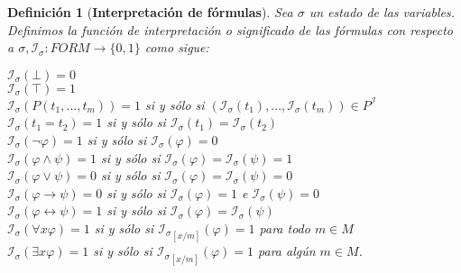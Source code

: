 \documentclass[letterpaper,11pt]{article}
\newtheorem{teo}{Definición}[]
\begin{document}
\begin{enumerate}
\begin{itemize}
            \begin{teo}[\textbf{Interpretación de fórmulas}]
                Sea $\sigma$ un estado de las variables. Definimos la
                función de interpretación o significado de las fórmulas con 
                respecto a $\sigma, \mathcal{I_{\sigma}}: FORM \rightarrow
                \{ 0,1 \}$ como sigue:
                \begin{center}
                    $\mathcal{I_{\sigma}}(\bot) = 0$ \\
                    $\mathcal{I_{\sigma}}(\top) = 1$ \\
                    $\mathcal{I_{\sigma}}(P(t_{1},...,t_{m})) = 1$ si y 
                    sólo si $(\mathcal{I_{\sigma}}(t_{1}), ...,
                    \mathcal{I_{\sigma}}(t_{m})) \in P^{\mathcal{I}}$ \\
                    $\mathcal{I_{\sigma}}(t_{1}=t_{2}) = 1$ si y sólo si 
                    $\mathcal{I_{\sigma}}(t_{1}) = 
                    \mathcal{I_{\sigma}}(t_{2})$ \\
                    $\mathcal{I_{\sigma}}(\neg \varphi) = 1$ si y sólo si 
                    $\mathcal{I_{\sigma}}(\varphi) = 0$ \\
                    $\mathcal{I_{\sigma}}(\varphi \land \psi) = 1$ si y sólo 
                    si $\mathcal{I_{\sigma}}(\varphi) = 
                    \mathcal{I_{\sigma}}(\psi) = 1$ \\
                    $\mathcal{I_{\sigma}}(\varphi \lor \psi) = 0$ si y sólo 
                    si $\mathcal{I_{\sigma}}(\varphi) = 
                    \mathcal{I_{\sigma}}(\psi) = 0$ \\
                    $\mathcal{I_{\sigma}}(\varphi \rightarrow \psi) = 0$ si 
                    y sólo si $\mathcal{I_{\sigma}}(\varphi) = 1$ e 
                    $\mathcal{I_{\sigma}}(\psi) = 0$ \\
                    $\mathcal{I_{\sigma}}(\varphi \leftrightarrow \psi) = 1$
                    si y sólo si $\mathcal{I_{\sigma}}(\varphi) = 
                    \mathcal{I_{\sigma}}(\psi)$ \\
                    $\mathcal{I_{\sigma}}(\forall x \varphi) = 1$ si y sólo si 
                    $\mathcal{I_{\sigma}}_{[x/m]}(\varphi) = 1$ para todo 
                    $m \in M$ \\
                    $\mathcal{I_{\sigma}}(\exists x \varphi) = 1$ si y sólo si
                    $\mathcal{I_{\sigma}}_{[x/m]}(\varphi) = 1$ para algún 
                    $m \in M$.
                \end{center}
            \end{teo}
        

\end{itemize}
\end{enumerate}
\end{document}
